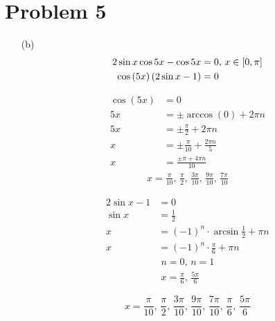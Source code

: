 \documentclass{article}
\begin{document}
\section*{Problem 5}
\begin{itemize}
\item[(b)]
	\begin{align*}
		2\sin x\cos5x-\cos5x&=0,\,x\in\interval{0}{\pi} \\
		\cos\left(5x\right)\left(2\sin x-1\right)&=0
	\end{align*}
	\begin{minipage}[t]{.5\textwidth}
		\begin{align*}
			\cos\left(5x\right)&=0 \\
			5x&=\pm\arccos\left(0\right)+2\pi n \\
			5x&=\pm\frac{\pi}{2}+2\pi n \\
			x&=\pm\frac{\pi}{10}+\frac{2\pi n}{5} \\
			x&=\frac{\pm\pi+4\pi n}{10}
		\end{align*}
		\begin{gather*}
			x=\frac{\pi}{10},\,\frac{\pi}{2},\,
				\frac{3\pi}{10},\,\frac{9\pi}{10},\,
				\frac{7\pi}{10}
		\end{gather*}
	\end{minipage}
	\begin{minipage}[t]{.5\textwidth}
		\begin{align*}
			2\sin x-1&=0 \\
			\sin x&=\frac{1}{2} \\
			x&=(-1)^n\cdot\arcsin\frac{1}{2}+\pi n \\
			x&=(-1)^n\cdot\frac{\pi}{6}+\pi n
		\end{align*}
		\begin{gather*}
			n=0,\,n=1 \\
			x=\frac{\pi}{6},\,\frac{5\pi}{6}
		\end{gather*}
	\end{minipage}
	\[
	\boxed{x=\frac{\pi}{10},\,\frac{\pi}{2},\,
	\frac{3\pi}{10},\,\frac{9\pi}{10},\,
	\frac{7\pi}{10},\,\frac{\pi}{6},\,\frac{5\pi}{6}}
	\]
\end{itemize}
\end{document}

